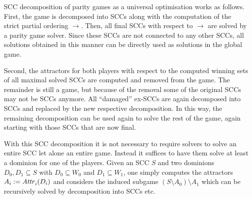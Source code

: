 SCC decomposition of parity games as a universal optimisation works as follows. First, the game is decomposed 
into SCCs along with the computation of the strict partial ordering $\rightarrow$. Then, all final SCCs 
with respect to $\rightarrow$ are solved by a parity game solver. Since these SCCs are not connected to any 
other SCCs, all solutions obtained in this manner can be directly used as solutions in the global game.

Second, the attractors for both players with respect to the computed winning sets of all maximal solved SCCs 
are computed and removed from the game. The remainder is still a game, but because of the removal some of the
original SCCs may not be SCCs anymore. All ``damaged'' ex-SCCs are again decomposed into SCCs and replaced by 
the new respective decomposition. 
In this way, the remaining decomposition can be used again to solve the rest of the game, again starting
with those SCCs that are now final. 




With this SCC decomposition it is not necessary to require solvers to solve an entire SCC let alone an entire
game. Instead it suffices to have them solve at least a dominion for one of the players. Given an SCC $S$ and
two dominions $D_0, D_1 \subseteq S$ with $D_0 \subseteq W_0$ and $D_1 \subseteq W_1$, one simply computes the 
attractors $A_i := \mathit{Attr}^{}_{i}(D_i)$ and considers the induced subgame $(S \setminus A_0) \setminus A_1$ which 
can be recursively solved by decomposition into SCCs etc.



